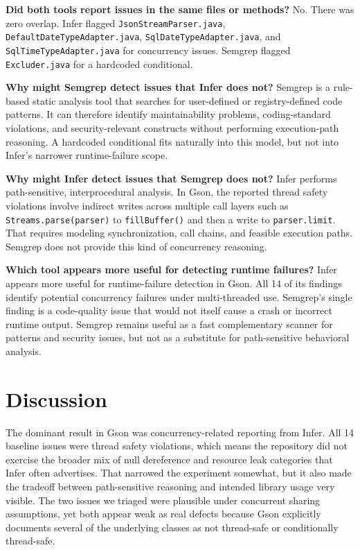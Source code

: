\documentclass[11pt]{article}
\begin{document}
\textbf{Did both tools report issues in the same files or methods?} No. There was zero overlap. Infer flagged \texttt{JsonStreamParser.java}, \texttt{DefaultDateTypeAdapter.java}, \texttt{SqlDateTypeAdapter.java}, and \texttt{SqlTimeTypeAdapter.java} for concurrency issues. Semgrep flagged \texttt{Excluder.java} for a hardcoded conditional.

\textbf{Why might Semgrep detect issues that Infer does not?} Semgrep is a rule-based static analysis tool that searches for user-defined or registry-defined code patterns. It can therefore identify maintainability problems, coding-standard violations, and security-relevant constructs without performing execution-path reasoning. A hardcoded conditional fits naturally into this model, but not into Infer's narrower runtime-failure scope.

\textbf{Why might Infer detect issues that Semgrep does not?} Infer performs path-sensitive, interprocedural analysis. In Gson, the reported thread safety violations involve indirect writes across multiple call layers such as \texttt{Streams.parse(parser)} to \texttt{fillBuffer()} and then a write to \texttt{parser.limit}. That requires modeling synchronization, call chains, and feasible execution paths. Semgrep does not provide this kind of concurrency reasoning.

\textbf{Which tool appears more useful for detecting runtime failures?} Infer appears more useful for runtime-failure detection in Gson. All 14 of its findings identify potential concurrency failures under multi-threaded use. Semgrep's single finding is a code-quality issue that would not itself cause a crash or incorrect runtime output. Semgrep remains useful as a fast complementary scanner for patterns and security issues, but not as a substitute for path-sensitive behavioral analysis.

\section{Discussion}
The dominant result in Gson was concurrency-related reporting from Infer. All 14 baseline issues were thread safety violations, which means the repository did not exercise the broader mix of null dereference and resource leak categories that Infer often advertises. That narrowed the experiment somewhat, but it also made the tradeoff between path-sensitive reasoning and intended library usage very visible. The two issues we triaged were plausible under concurrent sharing assumptions, yet both appear weak as real defects because Gson explicitly documents several of the underlying classes as not thread-safe or conditionally thread-safe.
\end{document}
